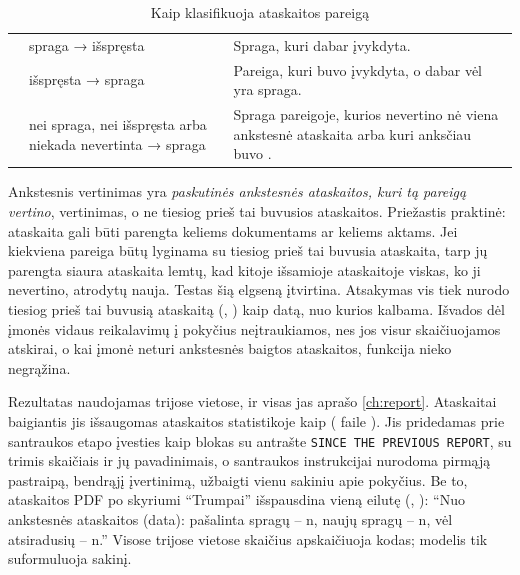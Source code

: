\begin{table}[H]
\caption{Kaip  klasifikuoja ataskaitos pareigą}\label{tab:register:changes}
\begin{tabularx}{\textwidth}{@{}L{20mm}L{44mm}Y@{}}
\toprule
{} &  &  \\
\midrule
{} & spraga → išspręsta & Spraga, kuri dabar įvykdyta. \\
 & išspręsta → spraga & Pareiga, kuri buvo įvykdyta, o dabar vėl yra spraga. \\
 & nei spraga, nei išspręsta arba niekada nevertinta → spraga & Spraga pareigoje,
  kurios nevertino nė viena ankstesnė ataskaita arba kuri anksčiau buvo . \\
\bottomrule
\end{tabularx}
\end{table}

Ankstesnis vertinimas yra \emph{paskutinės ankstesnės ataskaitos, kuri tą pareigą vertino},
vertinimas, o ne tiesiog prieš tai buvusios ataskaitos. Priežastis praktinė: ataskaita gali būti
parengta keliems dokumentams ar keliems aktams. Jei kiekviena pareiga būtų lyginama su tiesiog
prieš tai buvusia ataskaita, tarp jų parengta siaura ataskaita lemtų, kad kitoje išsamioje ataskaitoje viskas,
ko ji nevertino, atrodytų nauja. Testas
 šią elgseną įtvirtina.
Atsakymas vis tiek nurodo tiesiog prieš tai buvusią ataskaitą (, )
kaip datą, nuo kurios kalbama. Išvados dėl įmonės vidaus reikalavimų į pokyčius neįtraukiamos,
nes jos visur skaičiuojamos atskirai, o kai įmonė neturi ankstesnės baigtos ataskaitos, funkcija
nieko negrąžina.

Rezultatas naudojamas trijose vietose, ir visas jas aprašo \cref{ch:report}. Ataskaitai
baigiantis jis išsaugomas ataskaitos statistikoje kaip  (
faile ). Jis pridedamas prie santraukos etapo įvesties kaip blokas su
antrašte \texttt{SINCE THE PREVIOUS REPORT}, su trimis skaičiais ir jų pavadinimais, o santraukos
instrukcijai nurodoma pirmąją pastraipą, bendrąjį įvertinimą, užbaigti vienu sakiniu apie
pokyčius. Be to, ataskaitos PDF po skyriumi \enquote{Trumpai} išspausdina vieną eilutę
(, ): \enquote{Nuo ankstesnės ataskaitos (data): pašalinta
spragų -- n, naujų spragų -- n, vėl atsiradusių -- n.} Visose trijose vietose skaičius
apskaičiuoja kodas; modelis tik suformuluoja sakinį.


